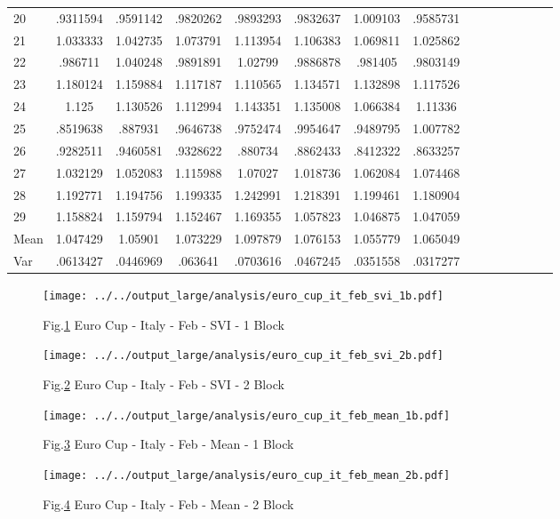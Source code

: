 \documentclass[a4paper,12pt]{article}
\begin{document}
\begin{landscape}
\begin{footnotesize}
\begin{center}
\begin{longtable}{lcccccccccccccc|}
20&.9311594&.9591142&.9820262&.9893293&.9832637&1.009103&.9585731&&&&&&& \\
21&1.033333&1.042735&1.073791&1.113954&1.106383&1.069811&1.025862&&&&&&& \\
22&.986711&1.040248&.9891891&1.02799&.9886878&.981405&.9803149&&&&&&& \\
23&1.180124&1.159884&1.117187&1.110565&1.134571&1.132898&1.117526&&&&&&& \\
24&1.125&1.130526&1.112994&1.143351&1.135008&1.066384&1.11336&&&&&&& \\
25&.8519638&.887931&.9646738&.9752474&.9954647&.9489795&1.007782&&&&&&& \\
26&.9282511&.9460581&.9328622&.880734&.8862433&.8412322&.8633257&&&&&&& \\
27&1.032129&1.052083&1.115988&1.07027&1.018736&1.062084&1.074468&&&&&&& \\
28&1.192771&1.194756&1.199335&1.242991&1.218391&1.199461&1.180904&&&&&&& \\
29&1.158824&1.159794&1.152467&1.169355&1.057823&1.046875&1.047059&&&&&&& \\
Mean&1.047429&1.05901&1.073229&1.097879&1.076153&1.055779&1.065049&&&&&&& \\
Var&.0613427&.0446969&.063641&.0703616&.0467245&.0351558&.0317277&&&&&&& \\ \hline
\end{longtable}
\end{center}
\end{footnotesize}
\end{landscape}

\begin{figure}[h!]
\caption{Fig.\ref{fig:fig1} Euro Cup - Italy - Feb - SVI - 1 Block }
\texttt{[image: ../../output\_large/analysis/euro\_cup\_it\_feb\_svi\_1b.pdf]}
\label{fig:fig1}
\end{figure}

\begin{figure}[h!]
\caption{Fig.\ref{fig:fig2} Euro Cup - Italy - Feb - SVI - 2 Block }
\texttt{[image: ../../output\_large/analysis/euro\_cup\_it\_feb\_svi\_2b.pdf]}
\label{fig:fig2}
\end{figure}

\begin{figure}[h!]
\caption{Fig.\ref{fig:fig3} Euro Cup - Italy - Feb - Mean - 1 Block }
\texttt{[image: ../../output\_large/analysis/euro\_cup\_it\_feb\_mean\_1b.pdf]}
\label{fig:fig3}
\end{figure}

\begin{figure}[h!]
\caption{Fig.\ref{fig:fig4} Euro Cup - Italy - Feb - Mean - 2 Block }
\texttt{[image: ../../output\_large/analysis/euro\_cup\_it\_feb\_mean\_2b.pdf]}
\label{fig:fig4}
\end{figure}
\end{document}
